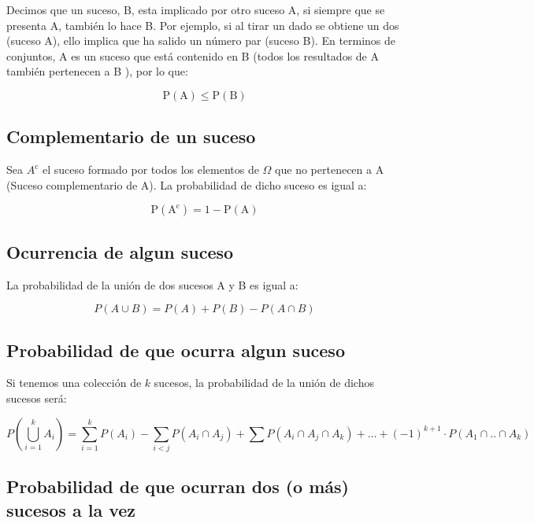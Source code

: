 \documentclass[
  a4paper,
  DIV=11,
  numbers=noendperiod]{scrreprt}
\begin{document}
Decimos que un suceso, B, esta implicado por otro suceso A, si siempre
que se presenta A, también lo hace B. Por ejemplo, si al tirar un dado
se obtiene un dos (suceso A), ello implica que ha salido un número par
(suceso B). En terminos de conjuntos, A es un suceso que está contenido
en B (todos los resultados de A también pertenecen a B ), por lo que:

\[
\mathrm{P}(\mathrm{A}) \leq \mathrm{P}(\mathrm{B})
\]

\subsection{Complementario de un
suceso}\label{complementario-de-un-suceso}

Sea \(A^{\mathrm{c}}\) el suceso formado por todos los elementos de
\(\Omega\) que no pertenecen a A (Suceso complementario de A). La
probabilidad de dicho suceso es igual a:

\[
\mathrm{P}\left(\mathrm{A}^{\mathrm{c}}\right)=1-\mathrm{P}(\mathrm{A})
\]

\subsection{Ocurrencia de algun
suceso}\label{ocurrencia-de-algun-suceso}

La probabilidad de la unión de dos sucesos A y B es igual a:

\[
P(A \cup B)=P(A)+P(B)-P(A \cap B)
\]

\subsection{Probabilidad de que ocurra algun
suceso}\label{probabilidad-de-que-ocurra-algun-suceso}

Si tenemos una colección de \(k\) sucesos, la probabilidad de la unión
de dichos sucesos será:

\[
P\left(\bigcup_{i=1}^{k} A_{i}\right)=\sum_{i=1}^{k} P\left(A_{i}\right)-\sum_{i<j} P\left(A_{i} \cap A_{j}\right)+\sum P\left(A_{i} \cap A_{j} \cap A_{k}\right)+\ldots+(-1)^{k+1} \cdot P\left(A_{1} \cap . . \cap A_{k}\right)
\]

\subsection{Probabilidad de que ocurran dos (o más) sucesos a la
vez}\label{probabilidad-de-que-ocurran-dos-o-muxe1s-sucesos-a-la-vez}
\end{document}
